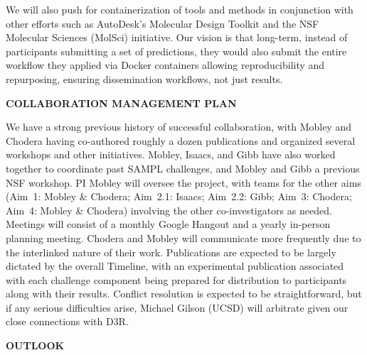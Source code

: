 \documentclass[11pt]{article}
\begin{document}
We will also push for containerization of tools and methods in conjunction with other efforts such as AutoDesk's Molecular Design Toolkit and the NSF Molecular Sciences (MolSci) initiative.
Our vision is that long-term, instead of participants submitting a set of predictions, they would also submit the entire workflow they applied via Docker containers allowing reproducibility and repurposing, ensuring dissemination workflows, not just results.


{\large \bf COLLABORATION MANAGEMENT PLAN} %

We have a strong previous history of successful collaboration, with Mobley and Chodera having co-authored roughly a dozen publications and organized several workshops and other initiatives.
Mobley, Isaacs, and Gibb have also worked together to coordinate past SAMPL challenges, and Mobley and Gibb a previous NSF workshop. 
PI Mobley will oversee the project, with teams for the other aims (Aim~1: Mobley \& Chodera; Aim~2.1: Isaacs; Aim~2.2: Gibb; Aim~3: Chodera; Aim~4: Mobley \& Chodera) involving the other co-investigators as needed.
Meetings will consist of a monthly Google Hangout and a yearly in-person planning meeting.
Chodera and Mobley will communicate more frequently due to the interlinked nature of their work.
Publications are expected to be largely dictated by the overall Timeline, with an experimental publication associated with each challenge component being prepared for distribution to participants along with their results.
Conflict resolution is expected to be straightforward, but if any serious difficulties arise, Michael Gilson (UCSD) will arbitrate given our close connections with D3R.

{\large \bf OUTLOOK} %
\end{document}
